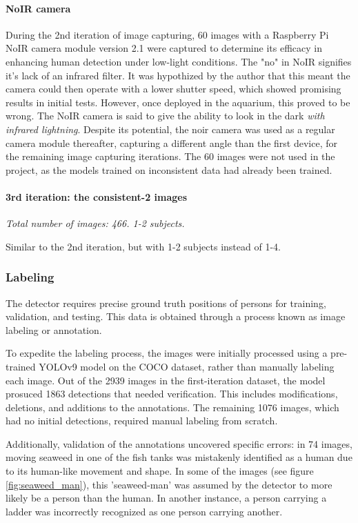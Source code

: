 \paragraph{NoIR camera}
During the 2nd iteration of image capturing, 60 images with a Raspberry Pi NoIR camera module version 2.1 were captured to determine its efficacy in enhancing human detection under low-light conditions. The "no" in NoIR signifies it's lack of an infrared filter. It was hypothized by the author that this meant the camera could then operate with a lower shutter speed, which showed promising results in initial tests. However, once deployed in the aquarium, this proved to be wrong. The NoIR camera is said to give the ability to look in the dark \textit{with infrared lightning}. Despite its potential, the noir camera was used as a regular camera module thereafter, capturing a different angle than the first device, for the remaining image capturing iterations. The 60 images were not used in the project, as the models trained on inconsistent data had already been trained.

\paragraph{3rd iteration: the consistent-2 images}
\textit{Total number of images: 466. 1-2 subjects.}

Similar to the 2nd iteration, but with 1-2 subjects instead of 1-4.

\subsubsection{Labeling}
\label{sec:labeling}

The detector requires precise ground truth positions of persons for training, validation, and testing. This data is obtained through a process known as image labeling or annotation.

To expedite the labeling process, the images were initially processed using a pre-trained YOLOv9 model on the COCO dataset, rather than manually labeling each image. Out of the 2939 images in the first-iteration dataset, the model prosuced 1863 detections that needed verification. This includes modifications, deletions, and additions to the annotations. The remaining 1076 images, which had no initial detections, required manual labeling from scratch.

Additionally, validation of the annotations uncovered specific errors: in 74 images, moving seaweed in one of the fish tanks was mistakenly identified as a human due to its human-like movement and shape. In some of the images (see figure \ref{fig:seaweed_man}), this 'seaweed-man' was assumed by the detector to more likely be a person than the human. In another instance, a person carrying a ladder was incorrectly recognized as one person carrying another. 

